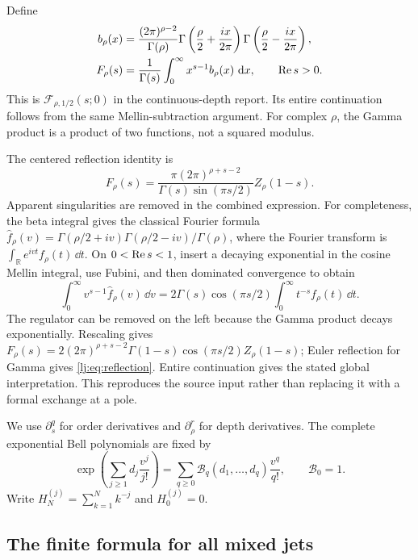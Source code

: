 Define
\begin{align}
 b_\rho(x)&=\frac{(2\pi)^{\rho-2}}{\Gamma(\rho)}
       \Gamma\left(\frac\rho2+\frac{ix}{2\pi}\right)
       \Gamma\left(\frac\rho2-\frac{ix}{2\pi}\right),
 \label{lj:eq:b}\\
 F_\rho(s)&=\frac1{\Gamma(s)}
       \int_0^\infty x^{s-1}b_\rho(x)\,\,\mathrm d x,
       \qquad \operatorname{Re} s>0.
 \label{lj:eq:F}
\end{align}
This is $\mathcal F_{\rho,1/2}(s;0)$ in the continuous-depth report.
Its entire continuation follows from the same Mellin-subtraction argument.
For complex $\rho$, the Gamma product is a product of two functions,
not a squared modulus.

The centered reflection identity is
\begin{equation}
 F_\rho(s)=\frac{\pi(2\pi)^{\rho+s-2}}
                 {\Gamma(s)\sin(\pi s/2)}Z_\rho(1-s).
 \label{lj:eq:reflection}
\end{equation}
Apparent singularities are removed in the combined expression. For
completeness, the beta integral gives the classical Fourier formula \cite{RamanujanFourier}
$\widehat f_\rho(v)=
\Gamma(\rho/2+iv)\Gamma(\rho/2-iv)/\Gamma(\rho)$, where the Fourier
transform is $\int_{\mathbb R}e^{ivt}f_\rho(t)\,\dd t$. On
$0<\operatorname{Re} s<1$, insert a decaying exponential in the cosine Mellin
integral, use Fubini, and then dominated convergence to obtain
\[
 \int_0^\infty v^{s-1}\widehat f_\rho(v)\,\dd v
 =2\Gamma(s)\cos(\pi s/2)
       \int_0^\infty t^{-s}f_\rho(t)\,\dd t.
\]
The regulator can be removed on the left because the Gamma product
decays exponentially. Rescaling gives
$F_\rho(s)=2(2\pi)^{\rho+s-2}\Gamma(1-s)
\cos(\pi s/2)Z_\rho(1-s)$; Euler reflection for Gamma gives
\eqref{lj:eq:reflection}. Entire continuation gives the stated global
interpretation. This reproduces the source input rather than replacing
it with a formal exchange at a pole.

We use $\partial_s^q$ for order derivatives and $\partial_\rho^r$ for
depth derivatives. The complete exponential Bell polynomials are fixed by
\begin{equation}
 \exp\left(\sum_{j\geq1}d_j\frac{v^j}{j!}\right)
 =\sum_{q\geq0}\mathcal B_q(d_1,\ldots,d_q)\frac{v^q}{q!},
 \qquad \mathcal B_0=1.
 \label{lj:eq:Bell}
\end{equation}
Write $H_N^{(j)}=\sum_{k=1}^N k^{-j}$ and $H_0^{(j)}=0$.

\subsection{The finite formula for all mixed jets}

